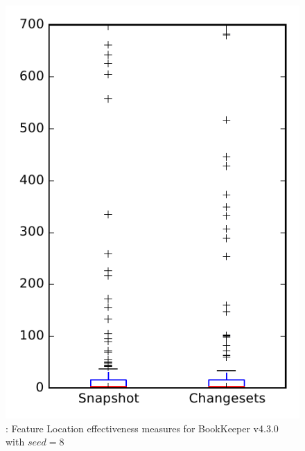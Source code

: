 
\begin{figure}
\centering
\includegraphics[height=0.4\textheight]{figures/flt_seed/rq1_bookkeeper_8}
\caption{\rone: Feature Location effectiveness measures for BookKeeper v4.3.0 with $seed=8$}
\label{fig:flt_seed:rq1:bookkeeper}
\end{figure}
